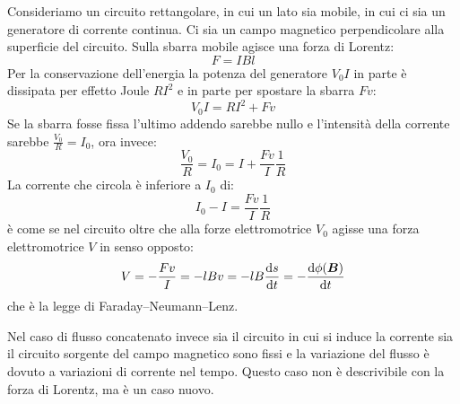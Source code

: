 Consideriamo un circuito rettangolare, in cui un lato sia mobile, in cui ci sia un generatore di corrente continua. Ci sia un campo magnetico perpendicolare alla superficie del circuito. Sulla sbarra mobile agisce una forza di Lorentz:
\begin{equation}
  F=IBl
\end{equation}
Per la conservazione dell'energia la potenza del generatore $V_0I$ in parte è dissipata per effetto Joule $RI^2$ e in parte per spostare la sbarra $Fv$:
\begin{equation}
  V_0I = RI^2+Fv
\end{equation}
Se la sbarra fosse fissa l'ultimo addendo sarebbe nullo e l'intensità della corrente sarebbe $\frac{V_0}{R}=I_0$, ora invece:
\begin{equation}
  \frac{V_0}{R}=I_0=I+\frac{Fv}{I}\frac{1}{R}
\end{equation}
La corrente che circola è inferiore a $I_0$ di:
\begin{equation}
  I_0-I=\frac{Fv}{I}\frac{1}{R}
\end{equation}
è come se nel circuito oltre che alla forze elettromotrice $V_0$ agisse una forza elettromotrice $V$ in senso opposto:
\begin{equation}
  V=-\frac{Fv}{I}=-lBv=-lB\frac{\mathrm{d} s}{\mathrm{d} t}=-\frac{\mathrm{d} \phi(\boldsymbol{B})}{\mathrm{d} t}
\end{equation}
che è la legge di Faraday--Neumann--Lenz.

Nel caso di flusso concatenato invece sia il circuito in cui si induce la corrente sia il circuito sorgente del campo magnetico sono fissi e la variazione del flusso è dovuto a variazioni di corrente nel tempo. Questo caso non è descrivibile con la forza di Lorentz, ma è un caso nuovo.
